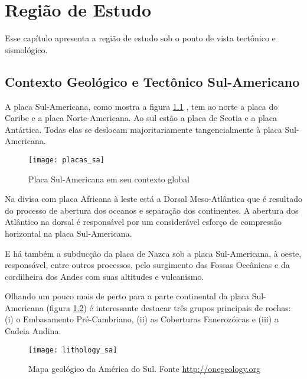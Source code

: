 \chapter{Região de Estudo}
\label{cap:regiao_de_estudo}


Esse capítulo apresenta a região de estudo sob o ponto de vista tectônico e sismológico.

\section{Contexto Geológico e Tectônico Sul-Americano}
\label{sec:03_america_do_sul}

A placa Sul-Americana, como mostra a figura \ref{fig:sa_plate} \citet{bizzi_2003}, tem ao norte a placa do Caribe e a
placa Norte-Americana.
Ao sul estão a placa de Scotia e a placa Antártica. Todas elas se deslocam 
majoritariamente tangencialmente
à placa Sul-Americana.

\begin{figure}[H]
  \centering
  \texttt{[image: placas\_sa]} 
  \caption{Placa Sul-Americana em seu contexto global}
  \label{fig:sa_plate} 
\end{figure}


Na divisa com placa Africana à leste está a Dorsal Meso-Atlântica que é resultado
do processo de abertura dos oceanos e separação dos continentes. A abertura dos Atlântico na 
dorsal é responsável por um considerável esforço de compressão horizontal na placa Sul-Americana.

E há também a subducção da placa de Nazca sob a placa Sul-Americana, à oeste,
responsável, entre outros processos, pelo surgimento das Fossas Oceânicas e da
cordilheira dos Andes com suas altitudes e vulcanismo.

Olhando um pouco mais de perto para a parte continental da placa Sul-Americana
(figura \ref{fig:sa_tec}) é interessante destacar três grupos principais de rochas: 
(i) o Embasamento Pré-Cambriano, (ii) as Coberturas Fanerozóicas e (iii) a 
Cadeia Andina.

\begin{figure}[H]
  \centering
  \texttt{[image: lithology\_sa]} 
  \caption{Mapa geológico da América do Sul. Fonte \url{http://onegeology.org}}
  \label{fig:sa_tec} 
\end{figure}

